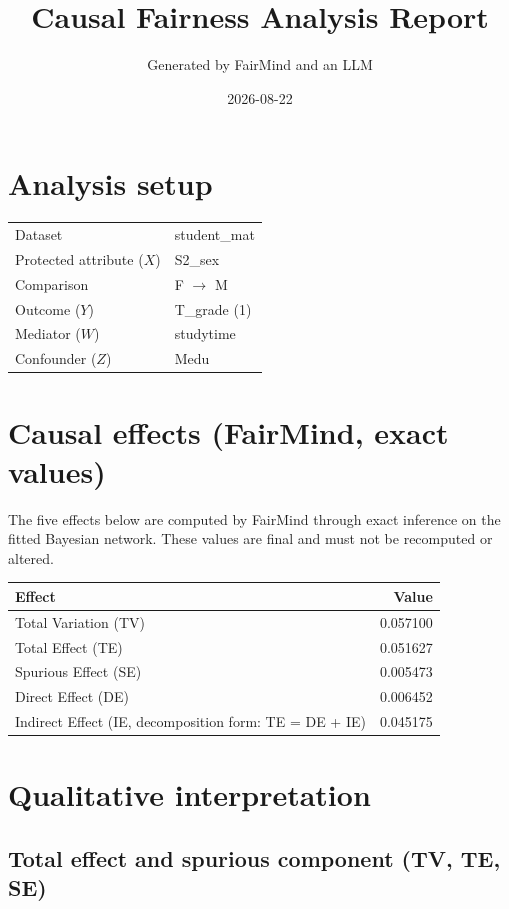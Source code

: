 \documentclass[11pt]{article}
\title{Causal Fairness Analysis Report}
\author{Generated by FairMind and an LLM}
\date{2026-08-22}
\begin{document}
\maketitle

\section{Analysis setup}

\begin{tabular}{ll}
\toprule
Dataset & student\_mat \\
Protected attribute ($X$) & S2\_sex \\
Comparison & F $\to$ M \\
Outcome ($Y$) & T\_grade (1) \\
Mediator ($W$) & studytime \\
Confounder ($Z$) & Medu \\
\bottomrule
\end{tabular}

\section{Causal effects (FairMind, exact values)}

The five effects below are computed by FairMind through exact inference on the
fitted Bayesian network. These values are final and must not be recomputed or
altered.

\begin{tabular}{lr}
\toprule
Effect & Value \\
\midrule
Total Variation (TV) & 0.057100 \\
Total Effect (TE) & 0.051627 \\
Spurious Effect (SE) & 0.005473 \\
Direct Effect (DE) & 0.006452 \\
Indirect Effect (IE, decomposition form: TE = DE + IE) & 0.045175 \\
\bottomrule
\end{tabular}

\section{Qualitative interpretation}

\subsection{Total effect and spurious component (TV, TE, SE)}
\end{document}
